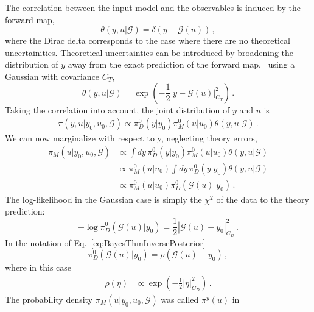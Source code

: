 The correlation between the input model and the observables is induced by the
forward map, 
\begin{equation}
  \label{eq:ThetaCorr}
  \theta(y,u|\mathcal{G}) = \delta\left(y - \mathcal{G}(u)\right)\, ,
\end{equation}
where the Dirac delta corresponds to the case where there are no theoretical
uncertainities. Theoretical uncertainties can be introduced by broadening the
distribution of $y$ away from the exact prediction of the forward map, \eg\
using a Gaussian with covariance $C_T$,
\begin{equation}
  \label{eq:TheoryErrors}
  \theta(y,u|\mathcal{G}) = \exp\left(
    -\frac12 
    \left| y - \mathcal{G}(u)
    \right|_{C_T}^2\right)\, .
\end{equation}
Taking the correlation into account, the joint distribution of $y$ and $u$ is
\begin{align}
  \label{eq:JointYAndU}
  \pi(y,u|y_0,u_0,\mathcal{G}) \propto 
  \pi_{D}^0(y|y_0) \pi_{M}^0(u|u_0) \theta(y,u|\mathcal{G})\, .
\end{align}
We can now marginalize with respect to y, neglecting theory errors, 
\begin{align}
  \label{eq:MarginOne}
  \pi_M(u|y_0,u_0,\mathcal{G}) 
  &\propto \int dy\, \pi_{D}^0(y|y_0) \pi_{M}^0(u|u_0) 
    \theta(y,u|\mathcal{G}) \\
  & \propto \pi_{M}^0(u|u_0)  \int dy\, \pi_{D}^0(y|y_0) 
    \theta(y,u|\mathcal{G}) \\
  & \propto \pi_{M}^0(u|u_0) \pi_{D}^0(\mathcal{G}(u)|y_0)\, .
\end{align}
The log-likelihood in the Gaussian case is simply the $\chi^2$ of the data to
the theory prediction:
\begin{equation}
  \label{eq:LikelyChiSq}
  -\log\pi_D^0(\mathcal{G}(u)|y_0) =  
      \frac12 \left|
      \mathcal{G}(u) - y_0
      \right|_{C_D}^2
    \, .
\end{equation}
In the notation of Eq.~\ref{eq:BayesThmInversePosterior}
\begin{equation}
  \label{eq:IdentifyRho}
  \pi_D^0(\mathcal{G}(u)|y_0) = \rho\left(
    \mathcal{G}(u) - y_0
  \right)\, ,
\end{equation}
where in this case 
\begin{align}
  \label{eq:RhoGauss}
  \rho(\eta) &\propto \exp\left(
               -\frac12 \left|\eta\right|_{C_D}^2
               \right)\, .
\end{align}
The probability density $\pi_M(u|y_0,u_0,\mathcal{G})$ was called $\pi^y(u)$ in
